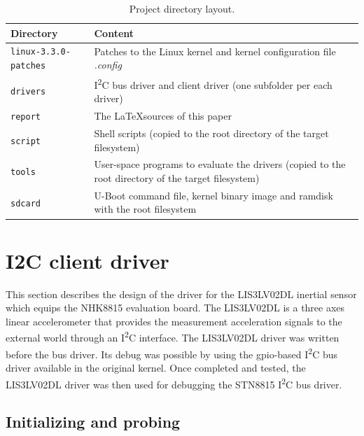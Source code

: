 \documentclass[a4paper,10pt]{article}
\newcommand{\iic}{I\textsuperscript{2}C }
\begin{document}
\begin{multicols}{2}
\begin{table}[t]
	\centering
	\renewcommand{\arraystretch}{1.2}	
	\begin{tabular}{p{4cm} p{12cm}}
		\hline
		Directory & Content \\
		\hline
		\texttt{linux-3.3.0-patches} & Patches to the Linux kernel and 
			kernel configuration file \emph{.config}\\
		\texttt{drivers} & \iic bus driver and client driver (one subfolder per
			each driver) \\
		\texttt{report} & The \LaTeX sources of this paper \\
		\texttt{script} & Shell scripts (copied to the root directory of the
			target filesystem) \\
		\texttt{tools} & User-space programs to evaluate the drivers (copied to
			the root directory of the target filesystem) \\
		\texttt{sdcard} & U-Boot command file, kernel binary image
			and ramdisk with the root filesystem \\
		\hline
	\end{tabular}
	\caption{Project directory layout.}
	\label{table:project-dir-layout}
\end{table}




\section{I2C client driver}
\label{sec:i2c_client_driver}

This section describes the design of the driver for the LIS3LV02DL inertial
sensor which equips the NHK8815 evaluation board.
The LIS3LV02DL is a three axes linear accelerometer that provides the measurement 
acceleration signals to the external world through an \iic interface.
The LIS3LV02DL driver was written before the bus driver. Its debug was possible
by using the gpio-based \iic bus driver available in the original kernel. Once
completed and tested, the LIS3LV02DL driver was then used for debugging the
STN8815 \iic bus driver.



\subsection{Initializing and probing}
\label{sec:lis3_init_probe}


\end{multicols}
\end{document}
